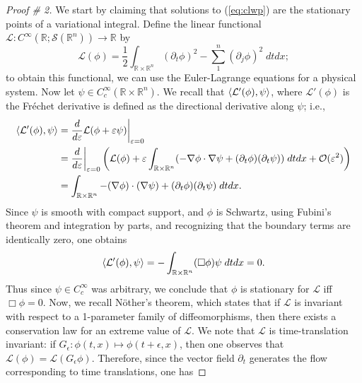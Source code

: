 \documentclass{article}
\begin{document}
\begin{proof}[Proof \# 2]
	We start by claiming that solutions to (\ref{eq:clwp}) are the stationary points of a variational integral. Define the linear functional $\mathcal{L}: C^{\infty}(\mathbb{R};\mathcal{S}(\mathbb{R}^{n})) \to \mathbb{R}$ by 
	\begin{equation*}
		\mathcal{L}(\phi) = \frac{1}{2}\int_{\mathbb{R} \times \mathbb{R}^{n}}(\partial_{t}\phi)^{2} - \sum_{1}^{n}(\partial_{j}\phi)^{2}\;dtdx; 
	\end{equation*}
	to obtain this functional, we can use the Euler-Lagrange equations for a physical system. Now let $\psi \in C_{c}^{\infty}(\mathbb{R} \times \mathbb{R}^{n})$. We recall that $\braket{\mathcal{L}'(\phi), \psi}$, where $\mathcal{L'}(\phi)$ is the Fr\'echet derivative is defined as the directional derivative along $\psi$; i.e., 
	\begin{align*}
		\begin{split}
			\braket{\mathcal{L}'(\phi), \psi} &= \frac{d}{d\varepsilon}\mathcal{L}(\phi + \varepsilon \psi)\bigg|_{\varepsilon = 0} \\
			&= \frac{d}{d\varepsilon}\bigg|_{\varepsilon = 0} \left(\mathcal{L}(\phi) + \varepsilon \int_{\mathbb{R} \times \mathbb{R}^n} (-\nabla \phi \cdot \nabla \psi + (\partial_{t}\phi)(\partial_{t}\psi))\;dtdx + \mathcal{O}(\varepsilon^2)\right) \\
			&= \int_{\mathbb{R} \times \mathbb{R}^{n}}-(\nabla \phi) \cdot (\nabla \psi) + (\partial_{t}\phi)(\partial_{t}\psi)\;dtdx. 
		\end{split}
	\end{align*} 
	Since $\psi$ is smooth with compact support, and $\phi$ is Schwartz, using Fubini's theorem and integration by parts, and recognizing that the boundary terms are identically zero, one obtains 
	\begin{equation*}
		\braket{\mathcal{L}'(\phi), \psi} = -\int_{\mathbb{R} \times \mathbb{R}^{n}}(\Box \phi) \psi\;dtdx = 0. 
	\end{equation*}
	Thus since $\psi \in C_{c}^{\infty}$ was arbitrary, we conclude that $\phi$ is stationary for $\mathcal{L}$ iff $\Box \phi = 0$. Now, we recall N\"other's theorem, which states that if $\mathcal{L}$ is invariant with respect to a 1-parameter family of diffeomorphisms, then there exists a conservation law for an extreme value of $\mathcal{L}$. We note that $\mathcal{L}$ is time-translation invariant: if $G_{\epsilon}: \phi(t, x) \mapsto \phi(t + \epsilon, x)$, then one observes that $\mathcal{L}(\phi) = \mathcal{L}(G_{\epsilon}\phi)$. Therefore, since the vector field $\partial_{t}$ generates the flow corresponding to time translations, one has 

\end{proof}
\end{document}
